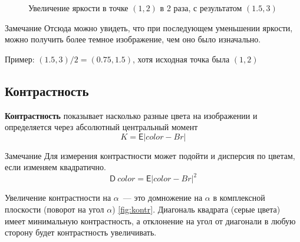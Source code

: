 \begin{figure}[h!]
    \centering
    \caption{Увеличение яркости в точке $(1, 2)$ в 2 раза, с результатом $(1.5, 3)$}
    \label{fig:upbr}
\end{figure}

\begin{callout}{Замечание}
    Отсюда можно увидеть, что при последующем уменьшении яркости, можно получить более темное изображение, чем оно было изначально.

    Пример:
    $(1.5, 3)/2 = (0.75, 1.5)$, хотя исходная точка была $(1, 2)$
\end{callout}

\subsection{Контрастность}

\textbf{Контрастность} показывает насколько разные цвета на изображении и определяется через абсолютный центральный момент
$$K = \mathsf{E}|color - Br|$$

\begin{callout}{Замечание}
    Для измерения контрастности может подойти и дисперсия по цветам, если изменяем квадратично.
    $$\mathsf{D} \ color = \mathsf{E}|color - Br|^2$$
\end{callout}

Увеличение контрастности на $\alpha$~--- это домножение на $\alpha$ в комплексной плоскости (поворот на угол $\alpha$) \ref{fig:kontr}. Диагональ квадрата (серые цвета) имеет минимальную контрастность, а отклонение на угол от диагонали в любую сторону будет контрастность увеличивать.

